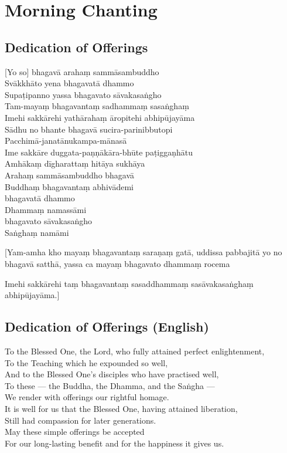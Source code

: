 \chapter{Morning Chanting}

\section*{Dedication of Offerings}

[Yo so] bhagavā arahaṃ sammāsambuddho\\
Svākkhāto yena bhagavatā dhammo\\
Supaṭipanno yassa bhagavato sāvakasaṅgho\\
Tam-mayaṃ bhagavantaṃ sadhammaṃ sasaṅghaṃ\\
Imehi sakkārehi yathārahaṃ āropitehi abhipūjayāma\\
Sādhu no bhante bhagavā sucira-parinibbutopi\\
Pacchimā-janatānukampa-mānasā\\
Ime sakkāre duggata-paṇṇākāra-bhūte paṭiggaṇhātu\\
Amhākaṃ dīgharattaṃ hitāya sukhāya\\
Arahaṃ sammāsambuddho bhagavā\\
Buddhaṃ bhagavantaṃ abhivādemi\\\relax
[Svākkhāto] bhagavatā dhammo\\
Dhammaṃ namassāmi\\\relax
[Supaṭipanno] bhagavato sāvakasaṅgho\\
Saṅghaṃ namāmi

[Yam-amha kho mayaṃ bhagavantaṃ saraṇaṃ gatā, uddissa pabbajitā yo no bhagavā
satthā, yassa ca mayaṃ bhagavato dhammaṃ rocema

Imehi sakkārehi taṃ bhagavantaṃ sasaddhammaṃ sasāvakasaṅghaṃ abhipūjayāma.]

\section*{Dedication of Offerings (English)}

To the Blessed One, the Lord, who fully attained perfect enlightenment,\\
To the Teaching which he expounded so well,\\
And to the Blessed One's disciples who have practised well,\\
To these --- the Buddha, the Dhamma, and the Saṅgha ---\\
We render with offerings our rightful homage.\\
It is well for us that the Blessed One, having attained liberation,\\
Still had compassion for later generations.\\
May these simple offerings be accepted\\
For our long-lasting benefit and for the happiness it gives us.

